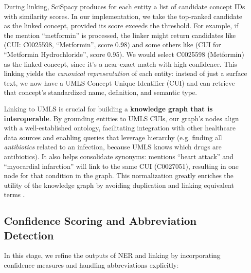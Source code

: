 During linking, SciSpacy produces for each entity a list of candidate concept IDs with similarity scores. In our implementation, we take the top-ranked candidate as the linked concept, provided its score exceeds the threshold. For example, if the mention ``metformin'' is processed, the linker might return candidates like (CUI: C0025598, ``Metformin'', score 0.98) and some others like (CUI for ``Metformin Hydrochloride'', score 0.95). We would select C0025598 (Metformin) as the linked concept, since it's a near-exact match with high confidence. This linking yields the \textit{canonical representation} of each entity: instead of just a surface text, we now have a UMLS Concept Unique Identifier (CUI) and can retrieve that concept's standardized name, definition, and semantic type.

Linking to UMLS is crucial for building a \textbf{knowledge graph that is interoperable}. By grounding entities to UMLS CUIs, our graph's nodes align with a well-established ontology, facilitating integration with other healthcare data sources and enabling queries that leverage hierarchy (e.g. finding all \textit{antibiotics} related to an infection, because UMLS knows which drugs are antibiotics). It also helps consolidate synonyms: mentions ``heart attack'' and ``myocardial infarction'' will link to the same CUI (C0027051), resulting in one node for that condition in the graph. This normalization greatly enriches the utility of the knowledge graph by avoiding duplication and linking equivalent terms \parencite{UMLS2024}.

\subsection{Confidence Scoring and Abbreviation Detection}
\label{sec:confidence}

In this stage, we refine the outputs of NER and linking by incorporating confidence measures and handling abbreviations explicitly:

